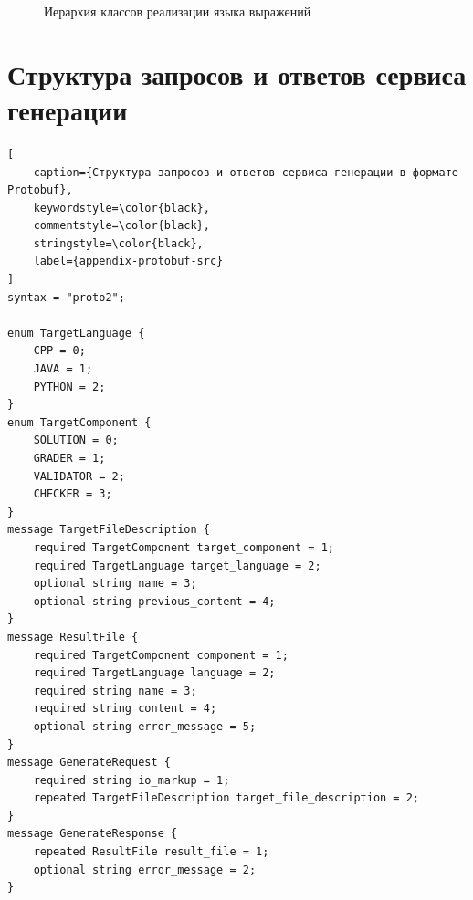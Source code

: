 \documentclass[times,specification,annotation]{style/itmo-student-thesis/itmo-student-thesis}
\begin{document}
\begin{figure}[!h]
\caption{Иерархия классов реализации языка выражений}\label{pl-classes-hierarchy}
\centering
\begin{adjustbox}{angle=-90}
\end{adjustbox}
\end{figure}


\chapter{Структура запросов и ответов сервиса генерации}\label{appendix-protobuf}

\begin{lstlisting}[
    caption={Структура запросов и ответов сервиса генерации в формате Protobuf},
    keywordstyle=\color{black},
    commentstyle=\color{black},
    stringstyle=\color{black},
    label={appendix-protobuf-src}
]
syntax = "proto2";

enum TargetLanguage {
    CPP = 0;
    JAVA = 1;
    PYTHON = 2;
}
enum TargetComponent {
    SOLUTION = 0;
    GRADER = 1;
    VALIDATOR = 2;
    CHECKER = 3;
}
message TargetFileDescription {
    required TargetComponent target_component = 1;
    required TargetLanguage target_language = 2;
    optional string name = 3;
    optional string previous_content = 4;
}
message ResultFile {
    required TargetComponent component = 1;
    required TargetLanguage language = 2;
    required string name = 3;
    required string content = 4;
    optional string error_message = 5;
}
message GenerateRequest {
    required string io_markup = 1;
    repeated TargetFileDescription target_file_description = 2;
}
message GenerateResponse {
    repeated ResultFile result_file = 1;
    optional string error_message = 2;
}
\end{lstlisting}
\end{document}
